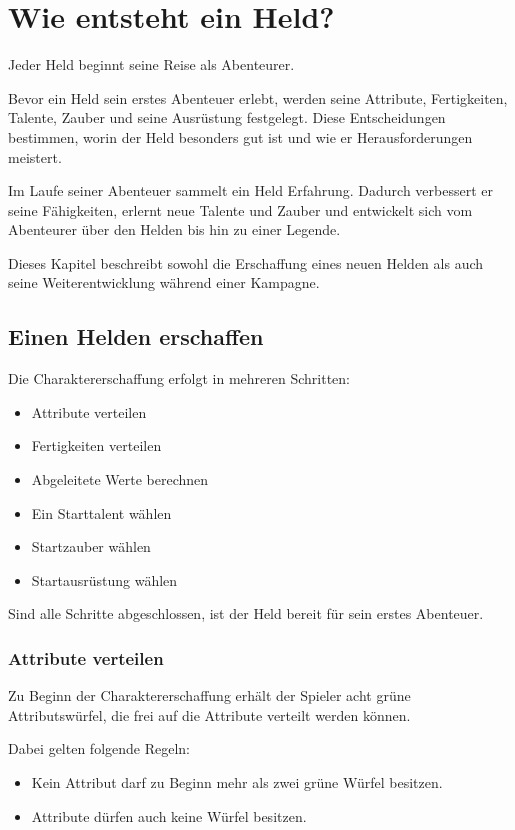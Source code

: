 \chapter{Wie entsteht ein Held?}

Jeder Held beginnt seine Reise als Abenteurer.

Bevor ein Held sein erstes Abenteuer erlebt, werden seine Attribute, Fertigkeiten, Talente, Zauber und seine Ausrüstung festgelegt. Diese Entscheidungen bestimmen, worin der Held besonders gut ist und wie er Herausforderungen meistert.

Im Laufe seiner Abenteuer sammelt ein Held Erfahrung. Dadurch verbessert er seine Fähigkeiten, erlernt neue Talente und Zauber und entwickelt sich vom Abenteurer über den Helden bis hin zu einer Legende.

Dieses Kapitel beschreibt sowohl die Erschaffung eines neuen Helden als auch seine Weiterentwicklung während einer Kampagne.

\section{Einen Helden erschaffen}

Die Charaktererschaffung erfolgt in mehreren Schritten:

\begin{itemize}
  \item Attribute verteilen
  \item Fertigkeiten verteilen
  \item Abgeleitete Werte berechnen
  \item Ein Starttalent wählen
  \item Startzauber wählen
  \item Startausrüstung wählen
\end{itemize}

Sind alle Schritte abgeschlossen, ist der Held bereit für sein erstes Abenteuer.

\subsection{Attribute verteilen}

Zu Beginn der Charaktererschaffung erhält der Spieler acht grüne Attributswürfel, die frei auf die Attribute verteilt werden können.

Dabei gelten folgende Regeln:

\begin{itemize}
  \item Kein Attribut darf zu Beginn mehr als zwei grüne Würfel besitzen.
  \item Attribute dürfen auch keine Würfel besitzen.
\end{itemize}

